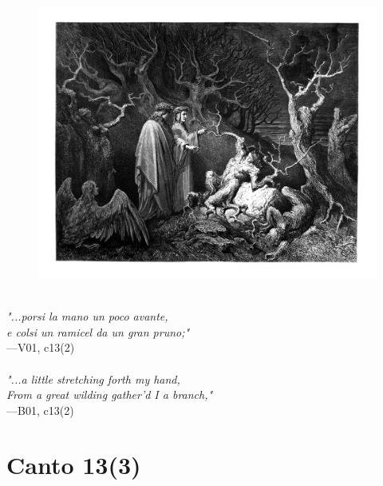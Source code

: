 \documentclass[../Dore_vision.tex]{subfiles}
\begin{document}
\begin{figure}[ht]
\centering
\includegraphics[height=\figsize]{illustrations/book_1/V01, c13(2).jpg}
\end{figure}

\begin{center}
\begin{minipage}{0.8\linewidth}
\textit{\\
"...porsi la mano un poco avante,\\e colsi un ramicel da un gran pruno;"} \\
—V01, c13(2) \\~\\
\textit{"...a little stretching forth my hand,\\From a great wilding gather'd I a branch,"} \\
—B01, c13(2)
\end{minipage}
\end{center}

\newpage

\section{Canto 13(3)}
\end{document}
